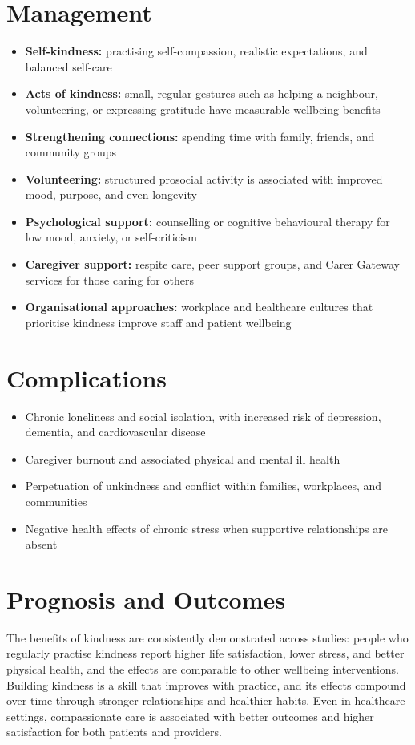 \section*{Management}
\begin{itemize}
    \item \textbf{Self-kindness:} practising self-compassion, realistic expectations, and balanced self-care
    \item \textbf{Acts of kindness:} small, regular gestures such as helping a neighbour, volunteering, or expressing gratitude have measurable wellbeing benefits
    \item \textbf{Strengthening connections:} spending time with family, friends, and community groups
    \item \textbf{Volunteering:} structured prosocial activity is associated with improved mood, purpose, and even longevity
    \item \textbf{Psychological support:} counselling or cognitive behavioural therapy for low mood, anxiety, or self-criticism
    \item \textbf{Caregiver support:} respite care, peer support groups, and Carer Gateway services for those caring for others
    \item \textbf{Organisational approaches:} workplace and healthcare cultures that prioritise kindness improve staff and patient wellbeing
\end{itemize}

\section*{Complications}
\begin{itemize}
    \item Chronic loneliness and social isolation, with increased risk of depression, dementia, and cardiovascular disease
    \item Caregiver burnout and associated physical and mental ill health
    \item Perpetuation of unkindness and conflict within families, workplaces, and communities
    \item Negative health effects of chronic stress when supportive relationships are absent
\end{itemize}

\section*{Prognosis and Outcomes}
The benefits of kindness are consistently demonstrated across studies: people who regularly practise kindness report higher life satisfaction, lower stress, and better physical health, and the effects are comparable to other wellbeing interventions. Building kindness is a skill that improves with practice, and its effects compound over time through stronger relationships and healthier habits. Even in healthcare settings, compassionate care is associated with better outcomes and higher satisfaction for both patients and providers.

